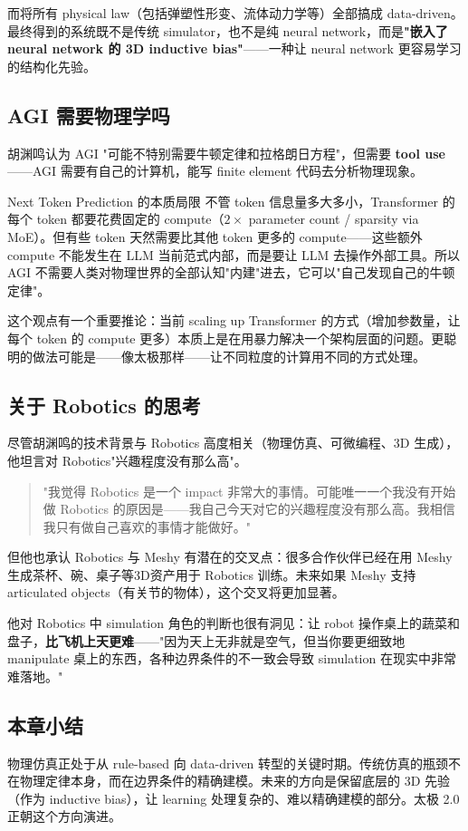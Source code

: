 而将所有 physical law（包括弹塑性形变、流体动力学等）全部搞成 data-driven。最终得到的系统既不是传统 simulator，也不是纯 neural network，而是\textbf{"嵌入了 neural network 的 3D inductive bias"}——一种让 neural network 更容易学习的结构化先验。

\subsection{AGI 需要物理学吗}

胡渊鸣认为 AGI "可能不特别需要牛顿定律和拉格朗日方程"，但需要 \textbf{tool use}——AGI 需要有自己的计算机，能写 finite element 代码去分析物理现象。

\begin{knowledgebox}{Next Token Prediction 的本质局限}
不管 token 信息量多大多小，Transformer 的每个 token 都要花费固定的 compute（$2 \times$ parameter count / sparsity via MoE）。但有些 token 天然需要比其他 token 更多的 compute——这些额外 compute 不能发生在 LLM 当前范式内部，而是要让 LLM 去操作外部工具。所以 AGI 不需要人类对物理世界的全部认知"内建"进去，它可以"自己发现自己的牛顿定律"。
\end{knowledgebox}

这个观点有一个重要推论：当前 scaling up Transformer 的方式（增加参数量，让每个 token 的 compute 更多）本质上是在用暴力解决一个架构层面的问题。更聪明的做法可能是——像太极那样——让不同粒度的计算用不同的方式处理。

\subsection{关于 Robotics 的思考}

尽管胡渊鸣的技术背景与 Robotics 高度相关（物理仿真、可微编程、3D 生成），他坦言对 Robotics"兴趣程度没有那么高"。

\begin{quote}
"我觉得 Robotics 是一个 impact 非常大的事情。可能唯一一个我没有开始做 Robotics 的原因是——我自己今天对它的兴趣程度没有那么高。我相信我只有做自己喜欢的事情才能做好。"
\end{quote}

但他也承认 Robotics 与 Meshy 有潜在的交叉点：很多合作伙伴已经在用 Meshy 生成茶杯、碗、桌子等3D资产用于 Robotics 训练。未来如果 Meshy 支持 articulated objects（有关节的物体），这个交叉将更加显著。

他对 Robotics 中 simulation 角色的判断也很有洞见：让 robot 操作桌上的蔬菜和盘子，\textbf{比飞机上天更难}——"因为天上无非就是空气，但当你要更细致地 manipulate 桌上的东西，各种边界条件的不一致会导致 simulation 在现实中非常难落地。"

\subsection{本章小结}

物理仿真正处于从 rule-based 向 data-driven 转型的关键时期。传统仿真的瓶颈不在物理定律本身，而在边界条件的精确建模。未来的方向是保留底层的 3D 先验（作为 inductive bias），让 learning 处理复杂的、难以精确建模的部分。太极 2.0 正朝这个方向演进。


